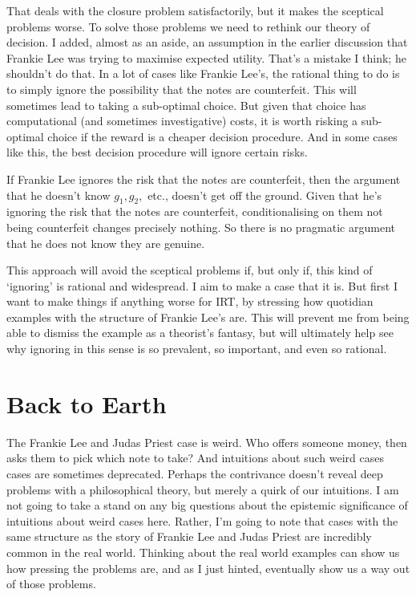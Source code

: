 \documentclass[
  12pt,
]{article}
\begin{document}
That deals with the closure problem satisfactorily, but it makes the sceptical problems worse. To solve those problems we need to rethink our theory of decision. I added, almost as an aside, an assumption in the earlier discussion that Frankie Lee was trying to maximise expected utility. That's a mistake I think; he shouldn't do that. In a lot of cases like Frankie Lee's, the rational thing to do is to simply ignore the possibility that the notes are counterfeit. This will sometimes lead to taking a sub-optimal choice. But given that choice has computational (and sometimes investigative) costs, it is worth risking a sub-optimal choice if the reward is a cheaper decision procedure. And in some cases like this, the best decision procedure will ignore certain risks.

If Frankie Lee ignores the risk that the notes are counterfeit, then the argument that he doesn't know \(g_1, g_2,\) etc., doesn't get off the ground. Given that he's ignoring the risk that the notes are counterfeit, conditionalising on them not being counterfeit changes precisely nothing. So there is no pragmatic argument that he does not know they are genuine.

This approach will avoid the sceptical problems if, but only if, this kind of `ignoring' is rational and widespread. I aim to make a case that it is. But first I want to make things if anything worse for IRT, by stressing how quotidian examples with the structure of Frankie Lee's are. This will prevent me from being able to dismiss the example as a theorist's fantasy, but will ultimately help see why ignoring in this sense is so prevalent, so important, and even so rational.

\hypertarget{backearth}{%
\section{Back to Earth}\label{backearth}}

The Frankie Lee and Judas Priest case is weird. Who offers someone money, then asks them to pick which note to take? And intuitions about such weird cases cases are sometimes deprecated. Perhaps the contrivance doesn't reveal deep problems with a philosophical theory, but merely a quirk of our intuitions. I am not going to take a stand on any big questions about the epistemic significance of intuitions about weird cases here. Rather, I'm going to note that cases with the same structure as the story of Frankie Lee and Judas Priest are incredibly common in the real world. Thinking about the real world examples can show us how pressing the problems are, and as I just hinted, eventually show us a way out of those problems.
\end{document}
